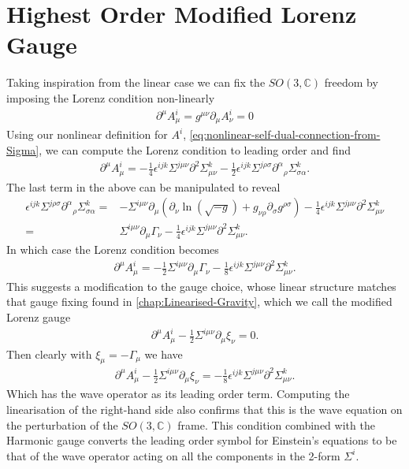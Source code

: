 \documentclass[10pt]{report}
\theoremstyle{definition}
\newcommand{\C}[0]{\mathbb{C}}
\begin{document}
        \section{Highest Order Modified Lorenz Gauge} \label{sec:nonlin-lorenz-gauge}
        Taking inspiration from the linear case we can fix the $SO(3,\C)$ freedom by imposing the Lorenz condition non-linearly
        \begin{align}
            \partial^\mu A^i_\mu = g^{\mu\nu} \partial_\mu A^i_\nu = 0
        \end{align}
        Using our nonlinear definition for $A^i$, \cref{eq:nonlinear-self-dual-connection-from-Sigma}, we can compute the Lorenz condition to leading order and find 
        \begin{align}
            \partial^\mu A^i_\mu = -\frac{1}{4}\epsilon^{ijk} \Sigma^{j\mu\nu} \partial^2 \Sigma^k_{\mu\nu} - \frac{1}{2} \epsilon^{ijk} \Sigma^{j\rho\sigma} \partial^\alpha{}_\rho \Sigma^k_{\sigma\alpha}.
        \end{align}
        The last term in the above can be manipulated to reveal
        \begin{align}
            \epsilon^{ijk} \Sigma^{j\rho\sigma} \partial^\alpha{}_\rho \Sigma^k_{\sigma\alpha} = &- \Sigma^{i\mu\nu} \partial_\mu \left( \partial_\nu \ln(\sqrt{-g}) + g_{\nu\rho} \partial_\sigma g^{\rho\sigma} \right) - \frac{1}{4} \epsilon^{ijk} \Sigma^{j\mu\nu} \partial^2 \Sigma^k_{\mu\nu} \\ = & \Sigma^{i\mu\nu} \partial_\mu \Gamma_\nu - \frac{1}{4} \epsilon^{ijk} \Sigma^{j\mu\nu} \partial^2 \Sigma^k_{\mu\nu}.
        \end{align}
        In which case the Lorenz condition becomes
        \begin{align}
            \partial^\mu A^i_\mu = -\frac{1}{2} \Sigma^{i\mu\nu} \partial_\mu \Gamma_\nu - \frac{1}{8} \epsilon^{ijk} \Sigma^{j\mu\nu} \partial^2 \Sigma^k_{\mu\nu}.
        \end{align}
        This suggests a modification to the gauge choice, whose linear structure matches that gauge fixing found in \cref{chap:Linearised-Gravity}, which we call the modified Lorenz gauge
        \begin{align}
            \partial^\mu A^i_\mu - \frac{1}{2} \Sigma^{i\mu\nu} \partial_\mu \xi_\nu = 0.
        \end{align}
        Then clearly with $\xi_\mu = - \Gamma_\mu$ we have 
        \begin{align}
            \partial^\mu A^i_\mu - \frac{1}{2} \Sigma^{i\mu\nu} \partial_\mu \xi_\nu = -\frac{1}{8}\epsilon^{ijk} \Sigma^{j\mu\nu} \partial^2 \Sigma^k_{\mu\nu}.
        \end{align}
        Which has the wave operator as its leading order term. Computing the linearisation of the right-hand side also confirms that this is the wave equation on the perturbation of the $SO(3,\C)$ frame. This condition combined with the Harmonic gauge converts the leading order symbol for Einstein's equations to be that of the wave operator acting on all the components in the 2-form $\Sigma^i$.
        
\end{document}
